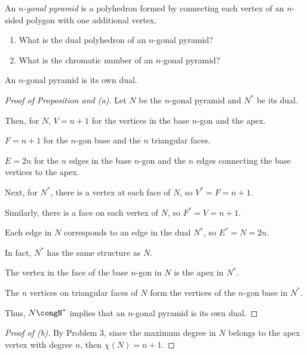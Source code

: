 \documentclass[../hw7]{subfiles}
\begin{document}
\begin{problem}
\item An \emph{$n$-gonal pyramid} is a polyhedron formed by connecting each vertex of an $n$-sided polygon with one additional vertex.
\begin{enumerate}
	\item What is the dual polyhedron of an $n$-gonal pyramid?
	\item What is the chromatic number of an $n$-gonal pyramid?
\end{enumerate}
\end{problem}
\begin{proposition}
	An $n$-gonal pyramid is its own dual.
\end{proposition}
\begin{proof}[Proof of Proposition and (a)]
Let $N$ be the $n$-gonal pyramid and  $N^*$ be its dual.

Then, for  $N$, $V=n+1$ for the vertices in the base  $n$-gon and the apex. 

 $F=n+1$ for the  $n$-gon base and the $n$ triangular faces. 

  $E=2n$ for the  $n$ edges in the base $n$-gon and the  $n$  edges connecting the base vertices to the apex. 

Next, for $N^*$, there is a vertex at each face of  $N$, so $V^*=F=n+1$. 

Similarly, there is a face on each vertex of  $N$, so  $F^*=V=n+1$. 

 Each edge in $N$ corresponds to an edge in the dual $N^*$, so  $E^*=N=2n$. 

 In fact,  $N^*$  has the same structure as $N$. 

 The vertex in the face of the base $n$-gon in  $N$ is the apex in  $N^*$. 

 The  $n$ vertices on triangular faces of $N$ form the vertices of the $n$-gon base in  $N^*$.

 Thus,  $N\congN^* $ implies that an $n$-gonal pyramid is its own dual. 
\end{proof}
\begin{proof}[Proof of (b)]
 By Problem 3, since the maximum degree in $N$ belongs to the apex vertex with  degree $n$, then $\chi(N)=n+1$. 
\end{proof}
\end{document}
